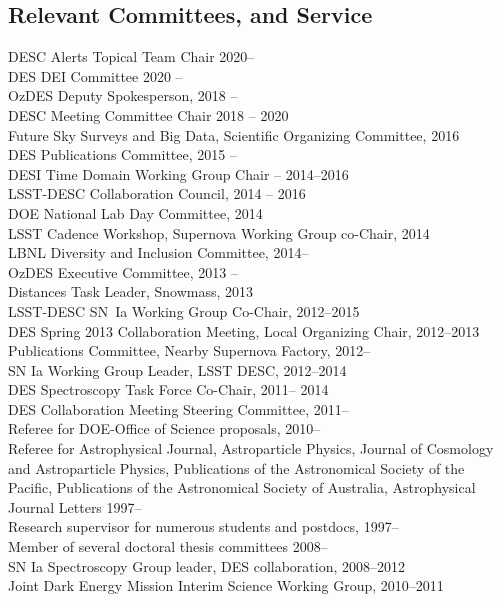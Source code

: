 \documentclass[line, margin]{res}
\begin{document}
\begin{resume}
\section{Relevant Committees, and Service}
DESC Alerts Topical Team Chair 2020-- \\
DES DEI Committee 2020 --\\
OzDES Deputy Spokesperson, 2018 --\\
DESC Meeting Committee Chair 2018 -- 2020\\
Future Sky Surveys and Big Data, Scientific Organizing Committee, 2016\\
DES Publications Committee, 2015 --\\
DESI Time Domain Working Group Chair -- 2014--2016\\
LSST-DESC Collaboration Council, 2014 -- 2016\\
DOE National Lab Day Committee, 2014\\
LSST Cadence Workshop, Supernova Working Group co-Chair, 2014\\
LBNL Diversity and Inclusion Committee, 2014--\\
OzDES Executive Committee, 2013 --\\
Distances Task Leader, Snowmass, 2013\\
LSST-DESC SN~Ia Working Group Co-Chair, 2012--2015\\
DES Spring 2013 Collaboration Meeting, Local Organizing Chair, 2012--2013\\
Publications Committee, Nearby Supernova Factory, 2012--\\
SN Ia Working Group Leader, LSST DESC, 2012--2014\\
DES Spectroscopy Task Force Co-Chair, 2011-- 2014\\
DES Collaboration Meeting Steering Committee, 2011--\\
Referee for DOE-Office of Science proposals, 2010-- \\
Referee for Astrophysical Journal, Astroparticle Physics, Journal of Cosmology and Astroparticle Physics, Publications of the Astronomical Society of the Pacific, Publications of the Astronomical Society of Australia, Astrophysical Journal Letters 1997--\\
Research supervisor for numerous students and postdocs, 1997--\\
Member of several doctoral thesis committees 2008--\\
SN Ia Spectroscopy Group leader, DES collaboration, 2008--2012\\
Joint Dark Energy Mission Interim Science Working Group, 2010--2011\\

\end{resume}
\end{document}
